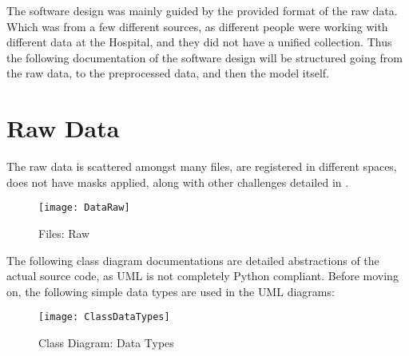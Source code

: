 The software design was mainly guided by the provided format of the raw data. Which was from a few different sources, as different people were working with different data at the Hospital, and they did not have a unified collection. Thus the following documentation of the software design will be structured going from the raw data, to the preprocessed data, and then the model itself.

\section{Raw Data}

The raw data is scattered amongst many files, are registered in different spaces, does not have masks applied, along with other challenges detailed in .

\begin{figure}[H]
\centering
\texttt{[image: DataRaw]}
\caption{Files: Raw}
\end{figure}

The following class diagram documentations are detailed abstractions of the actual source code, as \ac{UML} is not completely Python compliant. Before moving on, the following simple data types are used in the \ac{UML} diagrams:

\begin{figure}[H]
\centering
\texttt{[image: ClassDataTypes]}
\caption{Class Diagram: Data Types}
\end{figure}

